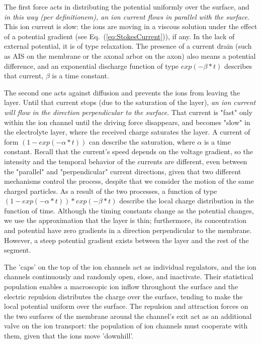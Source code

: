 The first force acts in distributing the potential uniformly  over the surface, and \textit{in this way (per definitionem), an ion 
current flows in parallel with the surface}. This ion current is slow: the ions are moving 
in a viscous solution under the effect of a potential gradient (see Eq.~(\ref{eq:StokesCurrent})), if any. In the lack of external potential, it is of type relaxation. The presence of a current drain (such as 
\gls{AIS}
on the membrane or the axonal arbor on the axon) also means a potential difference,  and an exponential discharge function of type $exp(-\beta *t)$
describes that current, $\beta$ is a time constant.

The second one acts against diffusion and prevents the ions from leaving the layer.
Until that current stops (due to the saturation of the layer),
\textit{an ion current will flow in the direction perpendicular to the surface}.
That current is "fast" only within the ion channel until the driving force disappears,
and becomes "slow" in the electrolyte layer, where the received charge saturates the layer. A current of form $(1-exp(-\alpha *t))$ can describe the saturation, where $\alpha$ is a time constant.
 Recall that the current's speed
depends on the voltage gradient, so the intensity and the temporal behavior of the 
currents are different, even between the "parallel" and "perpendicular" current directions, given that two different mechanisms control the process,
despite that we consider the motion of the same charged particles. As a result of the two processes, a function of type $(1-exp(-\alpha *t))*exp(-\beta *t)$ describe the local charge distribution in the function of time. Although the timing constants change
as the potential changes, we use the approximation that
the layer is thin; furthermore, its concentration and potential have zero gradients in a direction perpendicular to the membrane. However,
a steep potential gradient exists between the layer
and the rest of the segment.



The 'caps' on the top of the ion channels act as
individual regulators, and the ion channels continuously and randomly open, close, and inactivate. Their statistical population enables a
macroscopic ion inflow throughout the surface and the electric repulsion distributes
the charge over the surface, tending to make the local potential uniform over the surface.
The repulsion and attraction forces
on the two surfaces of the membrane around the channel's exit act as an additional valve on the ion transport:
the population 
of ion channels must cooperate with them, given that the ions move 'downhill'.


